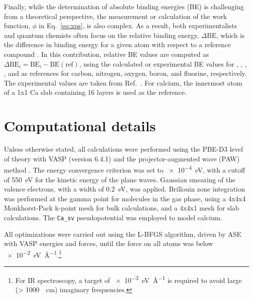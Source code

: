 \documentclass[12pt,a4paper]{article}
\begin{document}
Finally, while the determination of absolute binding energies (BE) is challenging from a theoretical perspective, the measurement or calculation of the work function, $\phi$ in Eq.~\eqref{eq:xps}, is also complex. As a result, both experimentalists and quantum chemists often focus on the relative binding energy, $\Delta\text{BE}$, which is the difference in binding energy for a given atom with respect to a reference compound \cite{vinesPredictionCoreLevel2018}. In this contribution, relative BE values are computed as $\Delta\text{BE}_i = \text{BE}_i - \text{BE}(\text{ref})$, using the calculated or experimental BE values for , , , , and  as references for carbon, nitrogen, oxygen, boron, and fluorine, respectively. The experimental values are taken from Ref.~\cite{pueyobellafontPredictingCoreLevel2017}. For calcium, the innermost atom of a 1x1 Ca slab containing 16 layers is used as the reference.

	
\section{Computational details}

Unless otherwise stated, all calculations were performed using the PBE-D3 level of theory with VASP (version 6.4.1) and the projector-augmented wave (PAW) method \cite{blochlProjectorAugmentedwaveMethod1994}. The energy convergence criterion was set to \SI{e-4}{\electronvolt}, with a cutoff of \SI{550}{\electronvolt} for the kinetic energy of the plane waves. Gaussian smearing of the valence electrons, with a width of \SI{0.2}{\electronvolt}, was applied. Brillouin zone integration was performed at the gamma point for molecules in the gas phase, using a 4x4x4 Monkhorst-Pack k-point mesh for bulk calculations, and a 4x4x1 mesh for slab calculations. The \texttt{Ca\_sv} pseudopotential was employed to model calcium.

All optimizations were carried out using the L-BFGS algorithm, driven by ASE \cite{larsenAtomicSimulationEnvironment2017} with VASP energies and forces, until the force on all atoms was below \SI{e-2}{\electronvolt\per\angstrom}.\footnote{For IR spectroscopy, a target of \SI{e-3}{\electronvolt\per\angstrom} is required to avoid large (> \SI{1000}{\per\centi\meter}) imaginary frequencies.}
\end{document}
